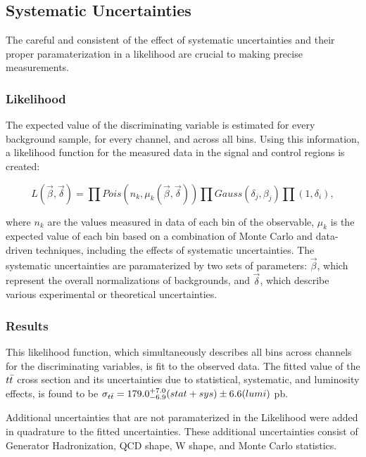 \subsection{Systematic Uncertainties}

The careful and consistent of the effect of systematic uncertainties and their proper paramaterization in a likelihood are crucial to making precise measurements.



\subsubsection{Likelihood}

The expected value of the discriminating variable is estimated for every background sample, for every channel, and across all bins.
Using this information, a likelihood function for the measured data in the signal and control regions is created:

\begin{equation}
  L(\vec{\beta}, \vec{\delta}) = \prod Pois(n_{k},\mu_{k}(\vec{\beta},\vec{\delta})) \prod Gauss(\delta_j, \beta_j) \prod( 1, \delta_i),
\end{equation}

where $n_k$ are the values measured in data of each bin of the observable, $\mu_k$ is the expected value of each bin based on a combination of Monte Carlo and data-driven techniques, including the effects of systematic uncertainties.
The systematic uncertainties are paramaterized by two sets of parameters: $\vec{\beta}$, which represent the overall normalizations of backgrounds, and $\vec{\delta}$, which describe various experimental or theoretical uncertainties.

\subsubsection{Results}

This likelihood function, which simultaneously describes all bins across channels for the discriminating variables, is fit to the observed data.
The fitted value of the $t\bar{t}$ cross section and its uncertainties due to statistical, systematic, and luminosity effects, is found to be $\sigma_{t\bar{t}} = 179.0 ^{+7.0}_{-6.9}(stat+sys) \pm 6.6 (lumi)$ pb.

Additional uncertainties that are not paramaterized in the Likelihood were added in quadrature to the fitted uncertainties.
These additional uncertainties consist of Generator Hadronization, QCD shape, W shape, and Monte Carlo statistics.

